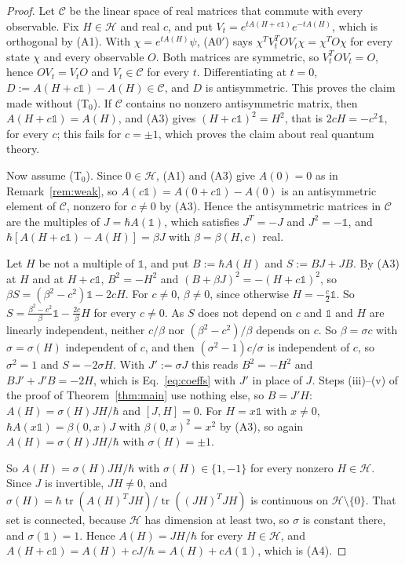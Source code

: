 \documentclass[11pt]{article}
\theoremstyle{remark}
\newcommand{\one}{\mathbb{1}}
\newcommand{\tr}{\operatorname{tr}}
\begin{document}
\begin{proof}
Let $\mathcal{C}$ be the linear space of real matrices that commute with every observable. Fix $H\in\mathcal{H}$ and real $c$, and put $V_t=e^{tA(H+c\one)}e^{-tA(H)}$, which is orthogonal by (A1). With $\chi=e^{tA(H)}\psi$, (A0$'$) says $\chi^TV_t^TOV_t\chi=\chi^TO\chi$ for every state $\chi$ and every observable $O$. Both matrices are symmetric, so $V_t^TOV_t=O$, hence $OV_t=V_tO$ and $V_t\in\mathcal{C}$ for every $t$. Differentiating at $t=0$, $D:=A(H+c\one)-A(H)\in\mathcal{C}$, and $D$ is antisymmetric. This proves the claim made without (T$_0$). If $\mathcal{C}$ contains no nonzero antisymmetric matrix, then $A(H+c\one)=A(H)$, and (A3) gives $(H+c\one)^2=H^2$, that is $2cH=-c^2\one$, for every $c$; this fails for $c=\pm1$, which proves the claim about real quantum theory.

Now assume (T$_0$). Since $0\in\mathcal{H}$, (A1) and (A3) give $A(0)=0$ as in Remark~\ref{rem:weak}, so $A(c\one)=A(0+c\one)-A(0)$ is an antisymmetric element of $\mathcal{C}$, nonzero for $c\neq0$ by (A3). Hence the antisymmetric matrices in $\mathcal{C}$ are the multiples of $J=\hbar A(\one)$, which satisfies $J^T=-J$ and $J^2=-\one$, and $\hbar[A(H+c\one)-A(H)]=\beta J$ with $\beta=\beta(H,c)$ real.

Let $H$ be not a multiple of $\one$, and put $B:=\hbar A(H)$ and $S:=BJ+JB$. By (A3) at $H$ and at $H+c\one$, $B^2=-H^2$ and $(B+\beta J)^2=-(H+c\one)^2$, so $\beta S=(\beta^2-c^2)\one-2cH$. For $c\neq0$, $\beta\neq0$, since otherwise $H=-\frac{c}{2}\one$. So $S=\frac{\beta^2-c^2}{\beta}\one-\frac{2c}{\beta}H$ for every $c\neq0$. As $S$ does not depend on $c$ and $\one$ and $H$ are linearly independent, neither $c/\beta$ nor $(\beta^2-c^2)/\beta$ depends on $c$. So $\beta=\sigma c$ with $\sigma=\sigma(H)$ independent of $c$, and then $(\sigma^2-1)c/\sigma$ is independent of $c$, so $\sigma^2=1$ and $S=-2\sigma H$. With $J':=\sigma J$ this reads $B^2=-H^2$ and $BJ'+J'B=-2H$, which is Eq.~\eqref{eq:coeffs} with $J'$ in place of $J$. Steps (iii)--(v) of the proof of Theorem~\ref{thm:main} use nothing else, so $B=J'H$: $A(H)=\sigma(H)JH/\hbar$ and $[J,H]=0$. For $H=x\one$ with $x\neq0$, $\hbar A(x\one)=\beta(0,x)J$ with $\beta(0,x)^2=x^2$ by (A3), so again $A(H)=\sigma(H)JH/\hbar$ with $\sigma(H)=\pm1$.

So $A(H)=\sigma(H)JH/\hbar$ with $\sigma(H)\in\{1,-1\}$ for every nonzero $H\in\mathcal{H}$. Since $J$ is invertible, $JH\neq0$, and $\sigma(H)=\hbar\tr(A(H)^TJH)/\tr((JH)^TJH)$ is continuous on $\mathcal{H}\setminus\{0\}$. That set is connected, because $\mathcal{H}$ has dimension at least two, so $\sigma$ is constant there, and $\sigma(\one)=1$. Hence $A(H)=JH/\hbar$ for every $H\in\mathcal{H}$, and $A(H+c\one)=A(H)+cJ/\hbar=A(H)+cA(\one)$, which is (A4).
\end{proof}
\end{document}
